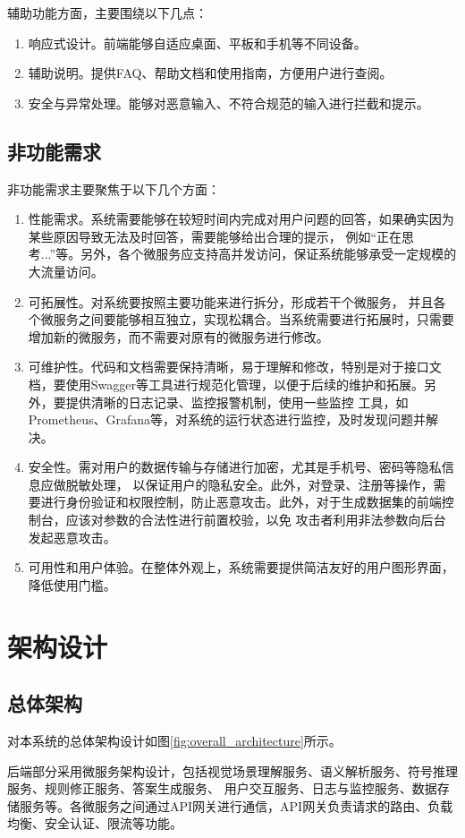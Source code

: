 辅助功能方面，主要围绕以下几点：
\begin{enumerate}[nosep]
\item 响应式设计。前端能够自适应桌面、平板和手机等不同设备。
\item 辅助说明。提供FAQ、帮助文档和使用指南，方便用户进行查阅。
\item 安全与异常处理。能够对恶意输入、不符合规范的输入进行拦截和提示。
\end{enumerate}
\subsection{非功能需求}
非功能需求主要聚焦于以下几个方面：
\begin{enumerate}[nosep]
\item 性能需求。系统需要能够在较短时间内完成对用户问题的回答，如果确实因为某些原因导致无法及时回答，需要能够给出合理的提示，
例如“正在思考...”等。另外，各个微服务应支持高并发访问，保证系统能够承受一定规模的大流量访问。
\item 可拓展性。对系统要按照主要功能来进行拆分，形成若干个微服务，
并且各个微服务之间要能够相互独立，实现松耦合。当系统需要进行拓展时，只需要增加新的微服务，而不需要对原有的微服务进行修改。
\item 可维护性。代码和文档需要保持清晰，易于理解和修改，特别是对于接口文档，要使用Swagger等工具进行规范化管理，以便于后续的维护和拓展。另外，要提供清晰的日志记录、监控报警机制，使用一些监控
工具，如Prometheus、Grafana等，对系统的运行状态进行监控，及时发现问题并解决。
\item 安全性。需对用户的数据传输与存储进行加密，尤其是手机号、密码等隐私信息应做脱敏处理，
以保证用户的隐私安全。此外，对登录、注册等操作，需要进行身份验证和权限控制，防止恶意攻击。此外，对于生成数据集的前端控制台，应该对参数的合法性进行前置校验，以免
攻击者利用非法参数向后台发起恶意攻击。
\item 可用性和用户体验。在整体外观上，系统需要提供简洁友好的用户图形界面，降低使用门槛。
\end{enumerate}

\section{架构设计}
\subsection{总体架构}
对本系统的总体架构设计如图\ref{fig:overall_architecture}所示。

后端部分采用微服务架构设计，包括视觉场景理解服务、语义解析服务、符号推理服务、规则修正服务、答案生成服务、
用户交互服务、日志与监控服务、数据存储服务等。各微服务之间通过API网关进行通信，API网关负责请求的路由、负载均衡、安全认证、限流等功能。

